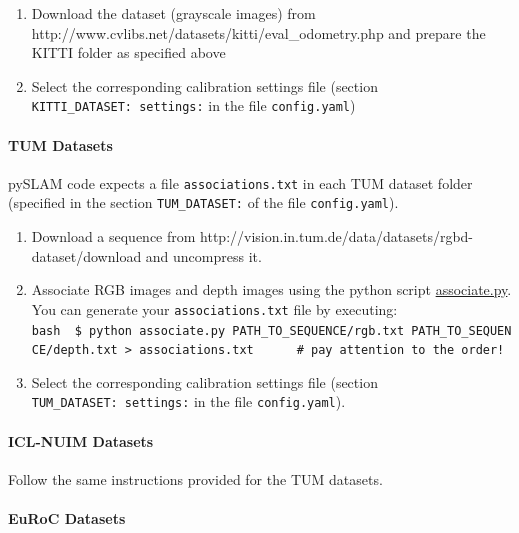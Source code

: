 \documentclass{article}
\providecommand{\tightlist}{%
  \setlength{\itemsep}{0pt}\setlength{\parskip}{0pt}}
\let\oldparagraph\paragraph
\renewcommand{\paragraph}[1]{\oldparagraph{#1}\mbox{}}
\begin{document}
\begin{enumerate}
\def\labelenumi{\arabic{enumi}.}
\item
  Download the dataset (grayscale images) from
  http://www.cvlibs.net/datasets/kitti/eval\_odometry.php and prepare
  the KITTI folder as specified above
\item
  Select the corresponding calibration settings file (section
  \texttt{KITTI\_DATASET:\ settings:} in the file \texttt{config.yaml})
\end{enumerate}

\hypertarget{tum-datasets}{%
\paragraph{TUM Datasets}\label{tum-datasets}}

pySLAM code expects a file \texttt{associations.txt} in each TUM dataset
folder (specified in the section \texttt{TUM\_DATASET:} of the file
\texttt{config.yaml}).

\begin{enumerate}
\def\labelenumi{\arabic{enumi}.}
\tightlist
\item
  Download a sequence from
  http://vision.in.tum.de/data/datasets/rgbd-dataset/download and
  uncompress it.
\item
  Associate RGB images and depth images using the python script
  \href{http://vision.in.tum.de/data/datasets/rgbd-dataset/tools}{associate.py}.
  You can generate your \texttt{associations.txt} file by executing:
  \texttt{bash\ \ \$\ python\ associate.py\ PATH\_TO\_SEQUENCE/rgb.txt\ PATH\_TO\_SEQUENCE/depth.txt\ \textgreater{}\ associations.txt\ \ \ \ \ \ \#\ pay\ attention\ to\ the\ order!}
\item
  Select the corresponding calibration settings file (section
  \texttt{TUM\_DATASET:\ settings:} in the file \texttt{config.yaml}).
\end{enumerate}

\hypertarget{icl-nuim-datasets}{%
\paragraph{ICL-NUIM Datasets}\label{icl-nuim-datasets}}

Follow the same instructions provided for the TUM datasets.

\hypertarget{euroc-datasets}{%
\paragraph{EuRoC Datasets}\label{euroc-datasets}}
\end{document}
